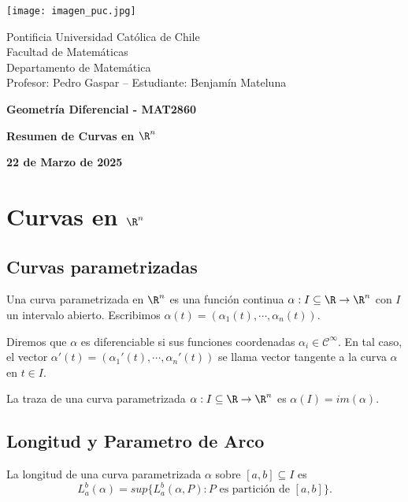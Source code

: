 \documentclass{article}
\begin{document}
\begin{minipage}{2.5cm}
    \texttt{[image: imagen\_puc.jpg]}
\end{minipage}
\begin{minipage}{14cm}
    {\sc Pontificia Universidad Católica de Chile\\
    Facultad de Matemáticas\\
    Departamento de Matemática\\
    Profesor: Pedro Gaspar -- Estudiante: Benjamín Mateluna}
\end{minipage}
\vspace{1ex}

{\centerline{\bf Geometría Diferencial - MAT2860}
\centerline{\bf Resumen de Curvas en $\R^{n}$}}
\centerline{\bf 22 de Marzo de 2025}

\newpage
\section{Curvas en \texorpdfstring{$\R^{n}$}{}}

\subsection{Curvas parametrizadas}

\begin{dfn}
    Una curva parametrizada en $\R^{n}$ es una función continua $\alpha:I\subseteq\R\to\R^{n}$ con 
    $I$ un intervalo abierto. Escribimos $\alpha(t)=(\alpha_{1}(t),\cdots,\alpha_{n}(t))$.
\end{dfn}

\noindent Diremos que $\alpha$ es diferenciable si sus funciones coordenadas 
$\alpha_{i}\in\mathcal{C}^{\infty}$. En tal caso, el vector 
$\alpha'(t)=(\alpha_{1}'(t),\cdots,\alpha_{n}'(t))$ se llama vector tangente a la curva $\alpha$ en
$t\in I$.

\begin{dfn}
    La traza de una curva parametrizada $\alpha:I\subseteq\R\to\R^{n}$ es $\alpha(I)=im(\alpha)$.
\end{dfn}

\subsection{Longitud y Parametro de Arco}
\begin{dfn}
    La longitud de una curva parametrizada $\alpha$ sobre $[a,b]\subseteq I$ es
    \begin{equation*}
        L_{a}^{b}(\alpha)=sup\{L_{a}^{b}(\alpha,P):P\text{ es partición de }[a,b]\}.
    \end{equation*}
\end{dfn}
\end{document}
